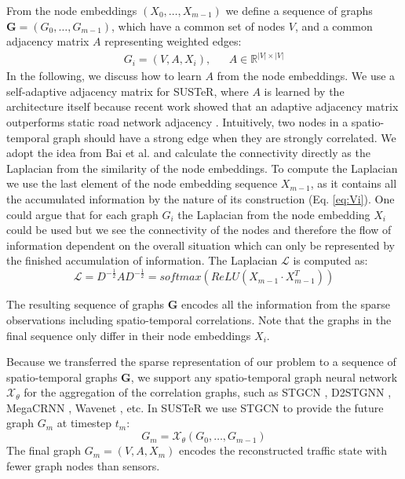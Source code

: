 From the node embeddings $(X_{0}, \dots, X_{m-1})$ we define a sequence of graphs $\bm{G} = (G_{0}, \dots, G_{m-1})$, which have a common set of nodes $V$, and a common adjacency matrix $A$ representing weighted edges:
\begin{align}
    G_i = \left(V, A, X_i \right), & &  A \in \mathbb{R}^{|V| \times |V|}
\end{align}
In the following, we discuss how to learn $A$ from the node embeddings.
We use a self-adaptive adjacency matrix for SUSTeR, where $A$ is learned by the architecture itself because recent work showed that an adaptive adjacency matrix outperforms static road network adjacency \cite{Lan22, Wu2019, Bai20}.
Intuitively, two nodes in a spatio-temporal graph should have a strong edge when they are strongly correlated.
We adopt the idea from Bai et al. \cite{Bai20} and calculate the connectivity directly as the Laplacian from the similarity of the node embeddings.
To compute the Laplacian we use the last element of the node embedding sequence $X_{m-1}$, as it contains all the accumulated information by the nature of its construction (Eq. \ref{eq:Vi}). 
One could argue that for each graph $G_i$ the Laplacian from the node embedding $X_i$ could be used but we see the connectivity of the nodes and therefore the flow of information dependent on the overall situation which can only be represented by the finished accumulation of information.
The Laplacian $\mathcal{L}$ is computed as:
\begin{equation}
    \mathcal{L} = D^{-\frac{1}{2}} A D^{-\frac{1}{2}} = softmax\left(ReLU \left(X^{\,}_{m-1} \cdot X_{m-1}^T \right) \right)
\end{equation}

The resulting sequence of graphs $\bm{G}$ encodes all the information from the sparse observations including spatio-temporal correlations.
Note that the graphs in the final sequence only differ in their node embeddings $X_i$.

Because we transferred the sparse representation of our problem to a sequence of spatio-temporal graphs $\bm{G}$, we support any spatio-temporal graph neural network $\mathcal{X}_{\theta}$ for the aggregation of the correlation graphs, such as STGCN \cite{Yu18}, D2STGNN \cite{Shao22}, MegaCRNN \cite{jiang23}, Wavenet \cite{Wu2019}, etc.
In SUSTeR we use STGCN to provide the future graph $G_m$ at timestep $t_m$:
\begin{equation}
    G_m = \mathcal{X}_{\theta}(G_{0}, \dots, G_{m-1})
\end{equation}
The final graph $G_m = (V, A, X_m)$ encodes the reconstructed traffic state with fewer graph nodes than sensors.


